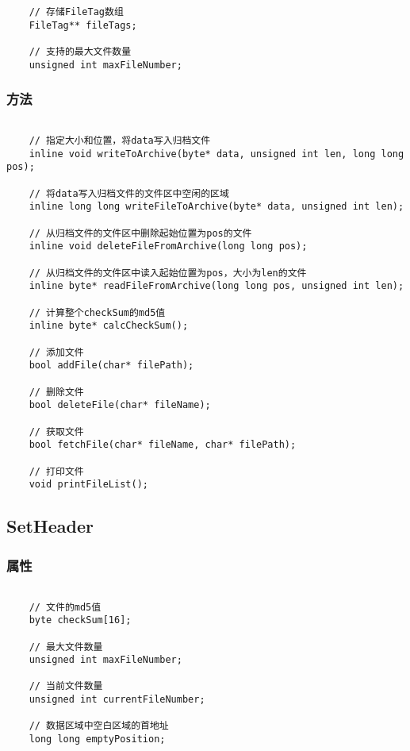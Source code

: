 \documentclass[11pt, a4paper]{article}
\begin{document}
\begin{CJK*}{UTF8}{gbsn}
\begin{lstlisting}
    // 存储FileTag数组
    FileTag** fileTags;

    // 支持的最大文件数量
    unsigned int maxFileNumber;
  \end{lstlisting}

  \subsubsection{方法}
  \begin{lstlisting}

    // 指定大小和位置，将data写入归档文件
    inline void writeToArchive(byte* data, unsigned int len, long long pos);

    // 将data写入归档文件的文件区中空闲的区域
    inline long long writeFileToArchive(byte* data, unsigned int len);

    // 从归档文件的文件区中删除起始位置为pos的文件
    inline void deleteFileFromArchive(long long pos);

    // 从归档文件的文件区中读入起始位置为pos，大小为len的文件
    inline byte* readFileFromArchive(long long pos, unsigned int len);

    // 计算整个checkSum的md5值
    inline byte* calcCheckSum();

    // 添加文件
    bool addFile(char* filePath);

    // 删除文件
    bool deleteFile(char* fileName);

    // 获取文件
    bool fetchFile(char* fileName, char* filePath);

    // 打印文件
    void printFileList(); 

  \end{lstlisting}

  \subsection{SetHeader}

  \subsubsection{属性}

  \begin{lstlisting}
    
    // 文件的md5值
    byte checkSum[16];

    // 最大文件数量
    unsigned int maxFileNumber;

    // 当前文件数量
    unsigned int currentFileNumber;

    // 数据区域中空白区域的首地址
    long long emptyPosition;


\end{lstlisting}
\end{CJK*}
\end{document}
